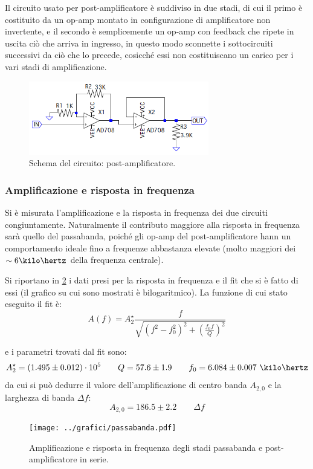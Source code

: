 \documentclass[a4paper,10pt]{article}
\begin{document}
Il circuito usato per post-amplificatore è suddiviso in due stadi, di cui il primo è costituito da un op-amp montato in configurazione di amplificatore non invertente, e il secondo è semplicemente un op-amp con feedback che ripete in uscita ciò che arriva in ingresso, in questo modo sconnette i sottocircuiti successivi da ciò che lo precede, cosicché essi non costituiscano un carico per i vari stadi di amplificazione. 

\begin{figure}[H]
	\vspace{-10pt}
	\centering
	\includegraphics[width=0.7\textwidth]{../grafici/PostAmp.png}
	\vspace{-12pt}
	\caption{Schema del circuito: post-amplificatore.}
	\label{fig:postamp}
	\vspace{-6pt}
\end{figure}

\subsubsection*{Amplificazione e risposta in frequenza}

Si è misurata l'amplificazione e la risposta in frequenza dei due circuiti congiuntamente. Naturalmente il contributo maggiore alla risposta in frequenza sarà quello del passabanda, poiché gli op-amp del post-amplificatore hann un comportamento ideale fino a frequenze abbastanza elevate (molto maggiori dei $\sim 6 \kilo\hertz $ della frequenza centrale).

Si riportano in \cref{fig:FITbandpass} i dati presi per la risposta in frequenza e il fit che si è fatto di essi (il grafico su cui sono mostrati è bilogaritmico).
La funzione di cui stato eseguito il fit è:
\[ A(f) = A_2^\star \frac{f}{\sqrt{(f^2-f_0^2)^2 + \left(\frac{f_0 f}{Q}\right)^2}} \]

e i parametri trovati dal fit sono:
\[ A_2^\star=(1.495 \pm 0.012)\cdot10^5 \qquad Q=57.6 \pm 1.9 \qquad f_0=6.084 \pm 0.007~\kilo\hertz  \]
da cui si può dedurre il valore dell'amplificazione di centro banda $ A_{2,0} $ e la larghezza di banda $ \Delta f $:
\[ A_{2,0} = 186.5 \pm 2.2	\qquad	\Delta f \]
\vspace*{-30pt}
\begin{figure}[H]
	\centering
	\texttt{[image: ../grafici/passabanda.pdf]}
	\vspace*{-5pt}
	\caption{Amplificazione e risposta in frequenza degli stadi passabanda e post-amplificatore in serie.}
	\label{fig:FITbandpass}
\end{figure}
\end{document}
